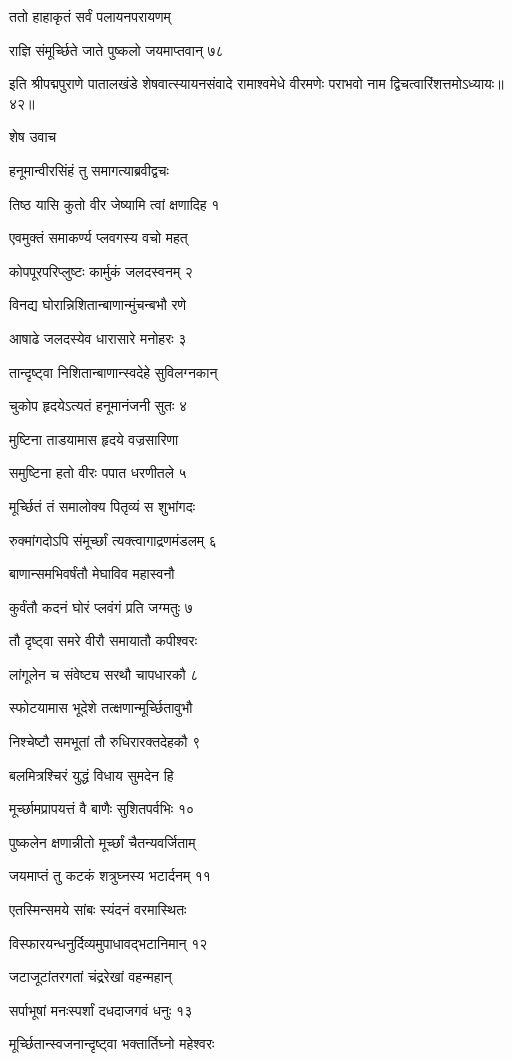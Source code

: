ततो हाहाकृतं सर्वं पलायनपरायणम्

राज्ञि संमूर्च्छिते जाते पुष्कलो जयमाप्तवान् ७८

इति श्रीपद्मपुराणे पातालखंडे शेषवात्स्यायनसंवादे रामाश्वमेधे वीरमणेः पराभवो नाम द्विचत्वारिंशत्तमोऽध्यायः॥४२॥


शेष उवाच

हनूमान्वीरसिंहं तु समागत्याब्रवीद्वचः

तिष्ठ यासि कुतो वीर जेष्यामि त्वां क्षणादिह १

एवमुक्तं समाकर्ण्य प्लवगस्य वचो महत्

कोपपूरपरिप्लुष्टः कार्मुकं जलदस्वनम् २

विनद्य घोरान्निशितान्बाणान्मुंचन्बभौ रणे

आषाढे जलदस्येव धारासारे मनोहरः ३

तान्दृष्ट्वा निशितान्बाणान्स्वदेहे सुविलग्नकान्

चुकोप हृदयेऽत्यतं हनूमानंजनी सुतः ४

मुष्टिना ताडयामास हृदये वज्रसारिणा

समुष्टिना हतो वीरः पपात धरणीतले ५

मूर्च्छितं तं समालोक्य पितृव्यं स शुभांगदः

रुक्मांगदोऽपि संमूर्च्छां त्यक्त्वागाद्रणमंडलम् ६

बाणान्समभिवर्षंतौ मेघाविव महास्वनौ

कुर्वंतौ कदनं घोरं प्लवंगं प्रति जग्मतुः ७

तौ दृष्ट्वा समरे वीरौ समायातौ कपीश्वरः

लांगूलेन च संवेष्ट्य सरथौ चापधारकौ ८

स्फोटयामास भूदेशे तत्क्षणान्मूर्च्छितावुभौ

निश्चेष्टौ समभूतां तौ रुधिरारक्तदेहकौ ९

बलमित्रश्चिरं युद्धं विधाय सुमदेन हि

मूर्च्छामप्रापयत्तं वै बाणैः सुशितपर्वभिः १०

पुष्कलेन क्षणान्नीतो मूर्च्छां चैतन्यवर्जिताम्

जयमाप्तं तु कटकं शत्रुघ्नस्य भटार्दनम् ११

एतस्मिन्समये सांबः स्यंदनं वरमास्थितः

विस्फारयन्धनुर्दिव्यमुपाधावद्भटानिमान् १२

जटाजूटांतरगतां चंद्ररेखां वहन्महान्

सर्पाभूषां मनःस्पर्शां दधदाजगवं धनुः १३

मूर्च्छितान्स्वजनान्दृष्ट्वा भक्तार्तिघ्नो महेश्वरः

